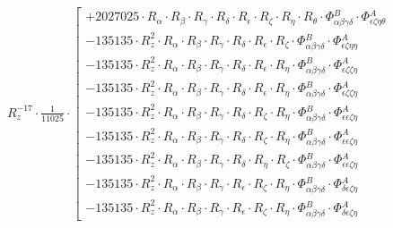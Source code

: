 \documentclass{article}
\begin{document}
\begin{subequations}
\begin{gather}
 R_{z}^{-17} \cdot \frac{1}{11025} \cdot  \left[ \begin{array}{c} 
 		+ 2027025 \cdot R_{\alpha{}} \cdot R_{\beta{}} \cdot R_{\gamma{}} \cdot R_{\delta{}} \cdot R_{\epsilon{}} \cdot R_{\zeta{}} \cdot R_{\eta{}} \cdot R_{\theta{}} \cdot \Phi{}^{B}_{\alpha{}\beta{}\gamma{}\delta{}} \cdot \Phi{}^{A}_{\epsilon{}\zeta{}\eta{}\theta{}} 
 \\[0.2em] 		 - 135135 \cdot R_{z}^{2} \cdot R_{\alpha{}} \cdot R_{\beta{}} \cdot R_{\gamma{}} \cdot R_{\delta{}} \cdot R_{\epsilon{}} \cdot R_{\zeta{}} \cdot \Phi{}^{B}_{\alpha{}\beta{}\gamma{}\delta{}} \cdot \Phi{}^{A}_{\epsilon{}\zeta{}\eta{}\eta{}} 
 \\[0.2em] 		 - 135135 \cdot R_{z}^{2} \cdot R_{\alpha{}} \cdot R_{\beta{}} \cdot R_{\gamma{}} \cdot R_{\delta{}} \cdot R_{\epsilon{}} \cdot R_{\eta{}} \cdot \Phi{}^{B}_{\alpha{}\beta{}\gamma{}\delta{}} \cdot \Phi{}^{A}_{\epsilon{}\zeta{}\zeta{}\eta{}} 
 \\[0.2em] 		 - 135135 \cdot R_{z}^{2} \cdot R_{\alpha{}} \cdot R_{\beta{}} \cdot R_{\gamma{}} \cdot R_{\delta{}} \cdot R_{\epsilon{}} \cdot R_{\eta{}} \cdot \Phi{}^{B}_{\alpha{}\beta{}\gamma{}\delta{}} \cdot \Phi{}^{A}_{\epsilon{}\zeta{}\zeta{}\eta{}} 
 \\[0.2em] 		 - 135135 \cdot R_{z}^{2} \cdot R_{\alpha{}} \cdot R_{\beta{}} \cdot R_{\gamma{}} \cdot R_{\delta{}} \cdot R_{\zeta{}} \cdot R_{\eta{}} \cdot \Phi{}^{B}_{\alpha{}\beta{}\gamma{}\delta{}} \cdot \Phi{}^{A}_{\epsilon{}\epsilon{}\zeta{}\eta{}} 
 \\[0.2em] 		 - 135135 \cdot R_{z}^{2} \cdot R_{\alpha{}} \cdot R_{\beta{}} \cdot R_{\gamma{}} \cdot R_{\delta{}} \cdot R_{\zeta{}} \cdot R_{\eta{}} \cdot \Phi{}^{B}_{\alpha{}\beta{}\gamma{}\delta{}} \cdot \Phi{}^{A}_{\epsilon{}\epsilon{}\zeta{}\eta{}} 
 \\[0.2em] 		 - 135135 \cdot R_{z}^{2} \cdot R_{\alpha{}} \cdot R_{\beta{}} \cdot R_{\gamma{}} \cdot R_{\delta{}} \cdot R_{\eta{}} \cdot R_{\zeta{}} \cdot \Phi{}^{B}_{\alpha{}\beta{}\gamma{}\delta{}} \cdot \Phi{}^{A}_{\epsilon{}\epsilon{}\zeta{}\eta{}} 
 \\[0.2em] 		 - 135135 \cdot R_{z}^{2} \cdot R_{\alpha{}} \cdot R_{\beta{}} \cdot R_{\gamma{}} \cdot R_{\epsilon{}} \cdot R_{\zeta{}} \cdot R_{\eta{}} \cdot \Phi{}^{B}_{\alpha{}\beta{}\gamma{}\delta{}} \cdot \Phi{}^{A}_{\delta{}\epsilon{}\zeta{}\eta{}} 
 \\[0.2em] 		 - 135135 \cdot R_{z}^{2} \cdot R_{\alpha{}} \cdot R_{\beta{}} \cdot R_{\gamma{}} \cdot R_{\epsilon{}} \cdot R_{\zeta{}} \cdot R_{\eta{}} \cdot \Phi{}^{B}_{\alpha{}\beta{}\gamma{}\delta{}} \cdot \Phi{}^{A}_{\delta{}\epsilon{}\zeta{}\eta{}} 

\end{array}
\end{gather}
\end{subequations}
\end{document}
